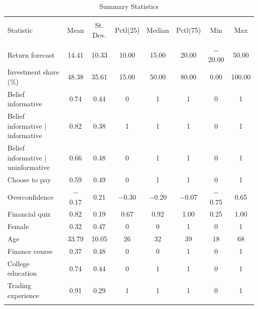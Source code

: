 
\begin{table}[!htbp] \centering 
  \caption{Summary Statistics} 
  \label{} 
\begin{tabular}{@{\extracolsep{5pt}}lccccccc} 
\\[-1.8ex]\hline 
\hline \\[-1.8ex] 
Statistic & \multicolumn{1}{c}{Mean} & \multicolumn{1}{c}{St. Dev.} & \multicolumn{1}{c}{Pctl(25)} & \multicolumn{1}{c}{Median} & \multicolumn{1}{c}{Pctl(75)} & \multicolumn{1}{c}{Min} & \multicolumn{1}{c}{Max} \\ 
\hline \\[-1.8ex] 
Return forecast & 14.41 & 10.33 & 10.00 & 15.00 & 20.00 & $-$20.00 & 50.00 \\ 
Investment share (\%) & 48.38 & 35.61 & 15.00 & 50.00 & 80.00 & 0.00 & 100.00 \\ 
Belief informative & 0.74 & 0.44 & 0 & 1 & 1 & 0 & 1 \\ 
Belief informative | informative & 0.82 & 0.38 & 1 & 1 & 1 & 0 & 1 \\ 
Belief informative | uninformative  & 0.66 & 0.48 & 0 & 1 & 1 & 0 & 1 \\ 
Choose to pay & 0.59 & 0.49 & 0 & 1 & 1 & 0 & 1 \\ 
Overconfidence & $-$0.17 & 0.21 & $-$0.30 & $-$0.20 & $-$0.07 & $-$0.75 & 0.65 \\ 
Financial quiz & 0.82 & 0.19 & 0.67 & 0.92 & 1.00 & 0.25 & 1.00 \\ 
Female & 0.32 & 0.47 & 0 & 0 & 1 & 0 & 1 \\ 
Age & 33.79 & 10.05 & 26 & 32 & 39 & 18 & 68 \\ 
Finance course & 0.37 & 0.48 & 0 & 0 & 1 & 0 & 1 \\ 
College education & 0.74 & 0.44 & 0 & 1 & 1 & 0 & 1 \\ 
Trading experience & 0.91 & 0.29 & 1 & 1 & 1 & 0 & 1 \\ 
\hline \\[-1.8ex] 
\end{tabular} 
\end{table} 
